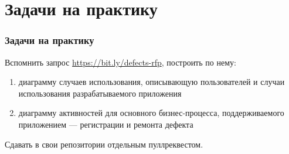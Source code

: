 \documentclass{../cscslides}
\begin{document}
    
    \frame{\titlepage}

    \section{Задачи на практику}

    \begin{frame}
        \frametitle{Задачи на практику}
        Вспомнить запрос \url{https://bit.ly/defects-rfp}, построить по нему:
        \begin{enumerate}
            \item диаграмму случаев использования, описывающую пользователей и случаи использования разрабатываемого приложения
            \item диаграмму активностей для основного бизнес-процесса, поддерживаемого приложением --- регистрации и ремонта дефекта
        \end{enumerate}
        Сдавать в свои репозитории отдельным пуллреквестом.
    \end{frame}
\end{document}
